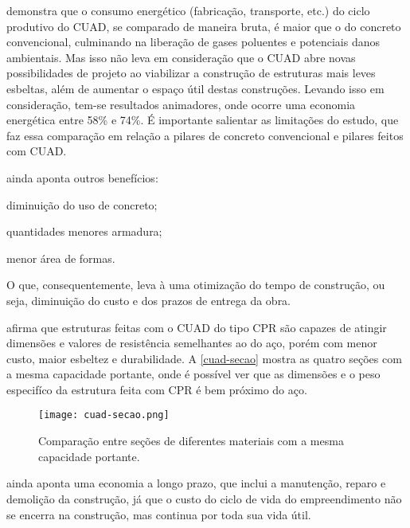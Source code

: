  demonstra que o consumo energético (fabricação, transporte, etc.) do ciclo produtivo do CUAD, se comparado de maneira bruta, é maior que o do concreto convencional, culminando na liberação de gases poluentes e potenciais danos ambientais. Mas isso não leva em consideração que o CUAD abre novas possibilidades de projeto ao viabilizar a construção de estruturas mais leves esbeltas, além de aumentar o espaço útil destas construções. Levando isso em consideração, tem-se resultados animadores, onde ocorre uma economia energética entre 58\% e 74\%. É importante salientar as limitações do estudo, que faz essa comparação em relação a pilares de concreto convencional e pilares feitos com CUAD.

 ainda aponta outros benefícios:

\begin{alineas}[label=\textbullet]
  \item diminuição do uso de concreto;
  \item quantidades menores armadura;
  \item menor área de formas.
\end{alineas}

O que, consequentemente, leva à uma otimização do tempo de construção, ou seja, diminuição do custo e dos prazos de entrega da obra.

 afirma que estruturas feitas com o CUAD do tipo CPR são capazes de atingir dimensões e valores de resistência semelhantes ao do aço, porém com menor custo, maior esbeltez e durabilidade. A \autoref{cuad-secao} mostra as quatro seções com a mesma capacidade portante, onde é possível ver que as dimensões e o peso especifíco da estrutura feita com CPR é bem próximo do aço.

\begin{figure}[htb]
	\caption{\label{cuad-secao}Comparação entre seções de diferentes materiais com a mesma capacidade portante.}
	\begin{center}
	    \texttt{[image: cuad-secao.png]}
	\end{center}
\end{figure}

 ainda aponta uma economia a longo prazo, que inclui a manutenção, reparo e demolição da construção, já que o custo do ciclo de vida do empreendimento não se encerra na construção, mas continua por toda sua vida útil.

